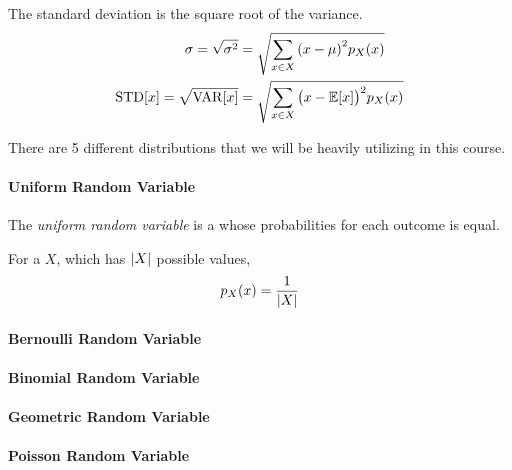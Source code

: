 \begin{definition}
  The standard deviation is the square root of the variance.
  \begin{equation}\label{eq:Discrete_Random_Variable-Standard_Deviation}
    \begin{aligned}
      \sigma = \sqrt{\sigma^{2}} &= \sqrt{\sum\limits_{x \in X} {\left( x - \mu \right)}^{2} p_{X}(x)} \\
      \operatorname{\operatorname{STD}}[x] = \sqrt{\operatorname{\operatorname{VAR}}[x]} &= \sqrt{\sum\limits_{x \in X} {\bigl( x - \operatorname{\operatorname{\mathbb{E}}}[x] \bigr)}^{2} p_{X}(x)} \\
    \end{aligned}
  \end{equation}
\end{definition}

There are 5 different  distributions that we will be heavily utilizing in this course.

\paragraph{Uniform Random Variable}\label{par:Uniform_Random_Variable}
\begin{definition}\label{def:Uniform_Random_Variable}
  The \emph{uniform random variable} is a  whose probabilities for each outcome is equal.

  For a  $X$, which has $\lvert X \rvert$ possible values,
  \begin{equation}\label{eq:Uniform_Random_Variable-Probability_Distribution}
    p_{X}(x) = \frac{1}{\lvert X \rvert}
  \end{equation}
\end{definition}

\paragraph{Bernoulli Random Variable}\label{par:Bernoulli_Random_Variable}
\paragraph{Binomial Random Variable}\label{par:Binomial_Random_Variable}
\paragraph{Geometric Random Variable}\label{par:Geometric_Random_Variable}
\paragraph{Poisson Random Variable}\label{par:Poisson_Random_Variable}
